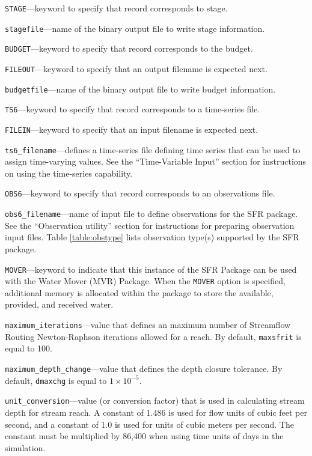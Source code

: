 \begin{description}
\item \texttt{STAGE}---keyword to specify that record corresponds to stage.

\item \texttt{stagefile}---name of the binary output file to write stage information.

\item \texttt{BUDGET}---keyword to specify that record corresponds to the budget.

\item \texttt{FILEOUT}---keyword to specify that an output filename is expected next.

\item \texttt{budgetfile}---name of the binary output file to write budget information.

\item \texttt{TS6}---keyword to specify that record corresponds to a time-series file.

\item \texttt{FILEIN}---keyword to specify that an input filename is expected next.

\item \texttt{ts6\_filename}---defines a time-series file defining time series that can be used to assign time-varying values. See the ``Time-Variable Input'' section for instructions on using the time-series capability.

\item \texttt{OBS6}---keyword to specify that record corresponds to an observations file.

\item \texttt{obs6\_filename}---name of input file to define observations for the SFR package. See the ``Observation utility'' section for instructions for preparing observation input files. Table \ref{table:obstype} lists observation type(s) supported by the SFR package.

\item \texttt{MOVER}---keyword to indicate that this instance of the SFR Package can be used with the Water Mover (MVR) Package.  When the \texttt{MOVER} option is specified, additional memory is allocated within the package to store the available, provided, and received water.

\item \texttt{maximum\_iterations}---value that defines an maximum number of Streamflow Routing Newton-Raphson iterations allowed for a reach. By default, \texttt{maxsfrit} is equal to 100.

\item \texttt{maximum\_depth\_change}---value that defines the depth closure tolerance. By default, \texttt{dmaxchg} is equal to $1 \times 10^{-5}$.

\item \texttt{unit\_conversion}---value (or conversion factor) that is used in calculating stream depth for stream reach. A constant of 1.486 is used for flow units of cubic feet per second, and a constant of 1.0 is used for units of cubic meters per second. The constant must be multiplied by 86,400 when using time units of days in the simulation.

\end{description}
